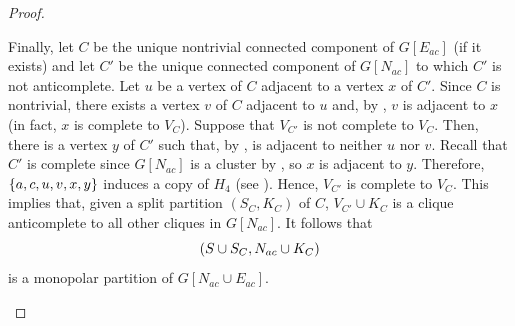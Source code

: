 \begin{proof}
\begin{enumerate}[label=(\roman*)]
            Finally, let $C$ be the unique nontrivial connected component of
            $G[E_{ac}]$ (if it exists) and let $C'$ be the unique connected
            component of $G[N_{ac}]$ to which $C'$ is not anticomplete. Let $u$
            be a vertex of $C$ adjacent to a vertex $x$ of $C'$. Since $C$ is
            nontrivial, there exists a vertex $v$ of $C$ adjacent to $u$ and, by
            , $v$ is adjacent to $x$ (in fact, $x$ is complete
            to $V_C$). Suppose that $V_{C'}$ is not complete to $V_C$. Then,
            there is a vertex $y$ of $C'$ such that, by , is
            adjacent to neither $u$ nor $v$. Recall that $C'$ is complete
            since $G[N_{ac}]$ is a cluster by , so $x$ is
            adjacent to $y$. Therefore, $\left\{a,c,u,v,x,y\right\}$ induces a copy of
            $H_{4}$ (see ). Hence, $V_{C'}$ is complete
            to $V_C$. This implies that, given a split partition $(S_C,K_C)$ of
            $C$, $V_{C'} \cup K_C$ is a clique anticomplete to all other cliques
            in $G[N_{ac}]$. It follows that
            \[
                \left(S \cup S_C , 
                N_{ac} \cup K_C\right)
            \]
            is a monopolar partition of $G[N_{ac} \cup E_{ac}]$.

            \begin{figure}[htb!]
                \centering
\end{figure}
\end{enumerate}
\end{proof}

